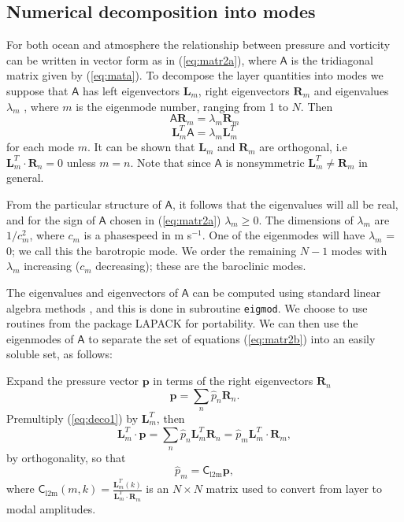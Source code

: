 \documentclass[11pt, a4paper,twoside]{article}
\newcommand{\vc}[1]{\mathbf{#1}}
\newcommand{\mtx}[1]{\vc{\mathsf{#1}}}
\newcommand{\clm}[0]{\mtx{C}_{\mathrm{l2m}}}
\numberwithin{equation}{section}
\begin{document}
\subsection{Numerical decomposition into modes}\label{sub:modes}
For both ocean and atmosphere the relationship between pressure and vorticity can be written in vector form as in (\ref{eq:matr2a}), where $\mtx{A}$ is the tridiagonal matrix given by (\ref{eq:mata}).
To decompose the layer quantities into modes we suppose that $\mtx{A}$ has left eigenvectors $\vc{L}_m$, right eigenvectors $\vc{R}_m$ and eigenvalues   $\lambda_m$  , where $m$ is the eigenmode number, ranging from 1 to $N$.
Then
\[ \mtx{A} \vc{R}_m  =     \lambda_m\vc{R}_m\]
\[ \vc{L}^T_m  \mtx{A}  =    \lambda_m \vc{L}^T_m\]
for each mode $m$.
It can be shown that $\vc{L}_m$  and $\vc{R}_m$  are orthogonal, i.e $\vc{L}_m^T \cdot \vc{R}_n = 0 $ unless $m = n$.
Note that since $\mtx{A}$ is nonsymmetric  $\vc{L}^T_m \ne \vc{R}_m$   in general.

From the particular structure of $\mtx{A}$, it follows that the eigenvalues will all be real, and for the sign of $\mtx{A}$ chosen in (\ref{eq:matr2a})  $\lambda_m \ge  0$.
The dimensions of    $\lambda_m $   are $1/c_m^2$, where $c_m$  is a phasespeed in m s$^{-1}$.
One of the eigenmodes will have    $\lambda_m $   = 0; we call this the barotropic mode.
We order the remaining $N-1$ modes with $\lambda_m$ increasing ($c_m$ decreasing); these are the baroclinic modes.

The eigenvalues and eigenvectors of $\mtx{A}$ can be computed using standard linear algebra methods \citep[see e.g.][]{golub:83}, and this is done in subroutine \verb=eigmod=.
We choose to use routines from the package LAPACK for portability.
We can then use the eigenmodes of $\mtx{A}$ to separate the set of equations (\ref{eq:matr2b})
into an easily soluble set, as follows:

Expand the pressure vector $\vc{p}$ in terms of the right eigenvectors $\vc{R}_n$
\begin{equation}\label{eq:deco1}
\vc{p} = \sum_n \hat{p}_n  \vc{R}_n.
\end{equation}
Premultiply (\ref{eq:deco1}) by $\vc{L}_m^T$, then
\begin{equation}\label{eq:deco2}
\vc{L}_m^T \cdot \vc{p} = \sum_n \hat{p}_n \vc{L}_m^T \vc{R}_n=  \hat{p}_m \vc{L}_m^T \cdot \vc{R}_m,
\end{equation}
by orthogonality, so that
\begin{equation}\label{eq:deco3}
\hat{p}_m = \clm \vc{p} ,
\end{equation}
where $\clm(m,k) = \frac{\vc{L}_m^T (k)}{ \vc{L}_m^T \cdot \vc{R}_m}$ is an $N \times N$ matrix used to  convert from layer to modal amplitudes.
\end{document}
